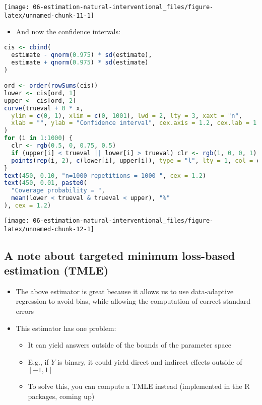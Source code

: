 \documentclass[
  12pt,
]{book}
\providecommand{\tightlist}{%
  \setlength{\itemsep}{0pt}\setlength{\parskip}{0pt}}
\theoremstyle{definition}
\theoremstyle{definition}
\theoremstyle{definition}
\newcommand{\1}{\mathbbm{1}}
\begin{document}
\begin{center}\texttt{[image: 06-estimation-natural-interventional\_files/figure-latex/unnamed-chunk-11-1]} \end{center}

\begin{itemize}
\tightlist
\item
  And now the confidence intervals:
\end{itemize}

\begin{lstlisting}[language=R]
cis <- cbind(
  estimate - qnorm(0.975) * sd(estimate),
  estimate + qnorm(0.975) * sd(estimate)
)

ord <- order(rowSums(cis))
lower <- cis[ord, 1]
upper <- cis[ord, 2]
curve(trueval + 0 * x,
  ylim = c(0, 1), xlim = c(0, 1001), lwd = 2, lty = 3, xaxt = "n",
  xlab = "", ylab = "Confidence interval", cex.axis = 1.2, cex.lab = 1.2
)
for (i in 1:1000) {
  clr <- rgb(0.5, 0, 0.75, 0.5)
  if (upper[i] < trueval || lower[i] > trueval) clr <- rgb(1, 0, 0, 1)
  points(rep(i, 2), c(lower[i], upper[i]), type = "l", lty = 1, col = clr)
}
text(450, 0.10, "n=1000 repetitions = 1000 ", cex = 1.2)
text(450, 0.01, paste0(
  "Coverage probability = ",
  mean(lower < trueval & trueval < upper), "%"
), cex = 1.2)
\end{lstlisting}

\begin{center}\texttt{[image: 06-estimation-natural-interventional\_files/figure-latex/unnamed-chunk-12-1]} \end{center}

\hypertarget{a-note-about-targeted-minimum-loss-based-estimation-tmle}{%
\subsection{A note about targeted minimum loss-based estimation (TMLE)}\label{a-note-about-targeted-minimum-loss-based-estimation-tmle}}

\begin{itemize}
\tightlist
\item
  The above estimator is great because it allows us to use data-adaptive regression to avoid bias, while allowing the computation of correct standard errors
\item
  This estimator has one problem:

  \begin{itemize}
  \tightlist
  \item
    It can yield answers outside of the bounds of the parameter space
  \item
    E.g., if \(Y\) is binary, it could yield direct and indirect effects outside of \([-1,1]\)
  \item
    To solve this, you can compute a TMLE instead (implemented in the R packages, coming up)
  \end{itemize}
\end{itemize}
\end{document}
